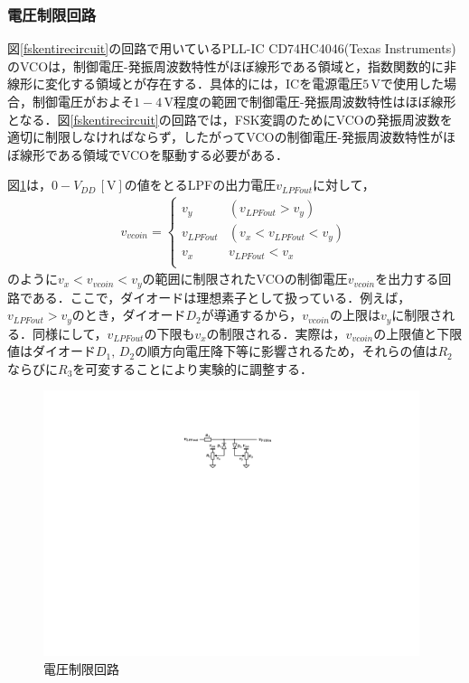 \subsubsection{電圧制限回路}
図\ref{fskentirecircuit}の回路で用いているPLL-IC  CD74HC4046(Texas Instruments)のVCOは，制御電圧-発振周波数特性がほぼ線形である領域と，指数関数的に非線形に変化する領域とが存在する．具体的には，ICを電源電圧$5 \, \mathrm{V}$で使用した場合，制御電圧がおよそ$1-4 \, \mathrm{V}$程度の範囲で制御電圧-発振周波数特性はほぼ線形となる\cite{Enzaka2014}．図\ref{fskentirecircuit}の回路では，FSK変調のためにVCOの発振周波数を適切に制限しなければならず，したがってVCOの制御電圧-発振周波数特性がほぼ線形である領域でVCOを駆動する必要がある．\par 
図\ref{voltagerestrictor}は，$0-V_{DD} \, \mathrm{[V]}$の値をとるLPFの出力電圧$v_{LPFout}$に対して，
\begin{eqnarray}
v_{vcoin}=\left\{ \begin{array}{ll}
v_y & (v_{LPFout}>v_y) \\
v_{LPFout} & (v_x<v_{LPFout}<v_y) \\
v_x & v_{LPFout}<v_x \\
\end{array} \right.
\end{eqnarray}
のように$v_x<v_{vcoin}<v_y$の範囲に制限されたVCOの制御電圧$v_{vcoin}$を出力する回路である．ここで，ダイオードは理想素子として扱っている．例えば，$v_{LPFout}>v_y$のとき，ダイオード$D_2$が導通するから，$v_{vcoin}$の上限は$v_y$に制限される．同様にして，$v_{LPFout}$の下限も$v_x$の制限される．実際は，$v_{vcoin}$の上限値と下限値はダイオード$D_1, \, D_2$の順方向電圧降下等に影響されるため，それらの値は$R_2$ならびに$R_3$を可変することにより実験的に調整する．


\begin{figure}[b]
\begin{center}

\includegraphics[width=110mm]{figures/voltagerestrictor.pdf}
\caption{電圧制限回路}
\label{voltagerestrictor}
\end{center}

\end{figure}


